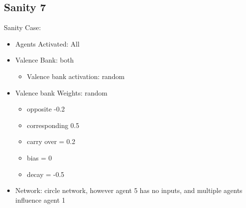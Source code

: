 \documentclass{article}\usepackage[]{graphicx}\usepackage[]{color}
\begin{document}
\subsection{Sanity 7}
\label{sec:sanity7}
Sanity Case:
\begin{itemize}
  \item Agents Activated: All
  \item Valence Bank: both
  \begin{itemize}
      \item Valence bank activation: random
  \end{itemize}
  \item Valence bank Weights: random
  \begin{itemize}
      \item opposite -0.2
      \item corresponding 0.5
      \item carry over = 0.2
      \item bias = 0
      \item decay = -0.5
  \end{itemize}
  \item Network: circle network, however agent 5 has no inputs, and multiple agents influence agent 1
\end{itemize}
\end{document}
